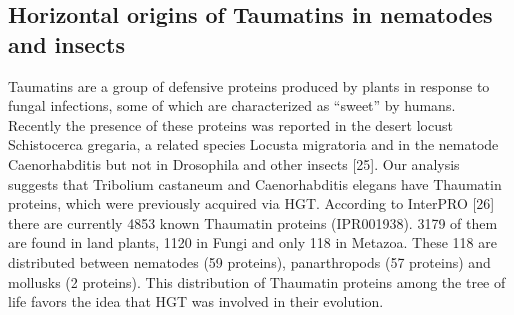 \subsection{Horizontal origins of Taumatins in nematodes and insects}
Taumatins are a group of defensive proteins produced by plants in response to fungal infections, some of which are characterized as “sweet” by humans. Recently the presence of these proteins was reported in the desert locust Schistocerca gregaria, a related species Locusta migratoria and in the nematode Caenorhabditis but not in Drosophila and other insects [25]. Our analysis suggests that Tribolium castaneum and Caenorhabditis elegans have Thaumatin proteins, which were previously acquired via HGT.
According to InterPRO [26] there are currently 4853 known Thaumatin proteins
(IPR001938). 3179 of them are found in land plants, 1120 in Fungi and only 118
in Metazoa. These 118 are distributed between nematodes (59 proteins),
panarthropods (57 proteins) and mollusks (2 proteins). This distribution of
Thaumatin proteins among the tree of life favors the idea that HGT was involved
in their evolution.
